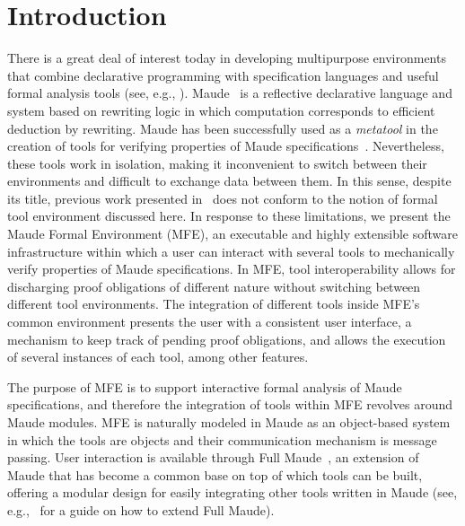 \section{Introduction}
\label{sec.intro}

There is a great deal of interest today in developing
multipurpose environments that combine declarative
programming with specification languages and useful
formal analysis tools (see, e.g., \cite{Mossakowski-Maeder-Luttich:2007,Franssen-Brand:2009,Hemer-Long-Strooper:2005,uitp-web-page,Aspinall-Luth:2007}).
Maude~\cite{CDELMMQ:2002,CDELMMT:2007-book} is a reflective declarative language and system based on 
rewriting logic in which computation
corresponds to efficient deduction by rewriting.
Maude has been successfully used as a {\em metatool} in the creation of tools for
verifying properties of Maude specifications~\cite{clavel99,CDHLMO:2007}.
Nevertheless, these tools work in isolation, 
making it inconvenient to switch between their environments
and difficult to exchange data between them.
In this sense, despite its title, previous work presented in~\cite{CDHLMO:2007}
does not conform to the notion of formal tool environment discussed here.
In response to these limitations, 
we present the Maude Formal Environment (MFE),
an executable and highly extensible software infrastructure
within which a user can interact with several 
tools to mechanically verify properties of Maude specifications.
In MFE, tool interoperability allows for discharging proof obligations
of different nature without switching between different
tool environments.
The integration of different tools inside 
MFE's common environment presents the user with a consistent user interface,
a mechanism to keep track of pending proof obligations,
and allows the execution of several instances of each tool,
among other features.

The purpose of MFE is to
support interactive formal analysis of Maude specifications,
and therefore the integration of tools within MFE 
revolves around Maude modules.
MFE is naturally modeled in Maude as an object-based system in which the tools are 
objects and their communication mechanism
is message passing. User interaction is available through
Full Maude~\cite{Duran-Meseguer:2007-scp,CDELMMT:2007-book}, an extension of Maude that
has become a common base on top of which tools
can be built, offering a modular design for easily
integrating other tools written in Maude (see, e.g.,~\cite{Duran-Olveczky:2008-wrla} for a guide on how to extend Full Maude).

